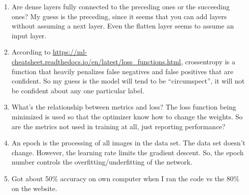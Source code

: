 \begin{enumerate}
	\item Are dense layers fully connected to the preceding ones or the
	succeeding ones? My guess is the preceding, since it seems that you can
	add layers without assuming a next layer. Even the flatten layer seems
	to assume an input layer.

	\item According to
	\url{https://ml-cheatsheet.readthedocs.io/en/latest/loss_functions.html},
	crossentropy is a function that heavily penalizes false negatives and
	false positives that are confident. So my guess is the model will tend
	to be ``circumspect'', it will not be confident about any one
	particular label. 

	\item What's the  relationship between metrics and loss? The loss
	function being minimized is used so that the optimizer know how to
	change the weights. So are the metrics not used in training at all,
	just reporting performance?

	\item An epoch is the processing of all images in the data set. The
	data set doesn't change.  However, the learning rate limits the
	gradient descent. So, the epoch number controls the
	overfitting/underfitting of the network.

	\item Got about 50\% accuracy on own computer when I ran the code vs
	the 80\% on the website.

\end{enumerate}
